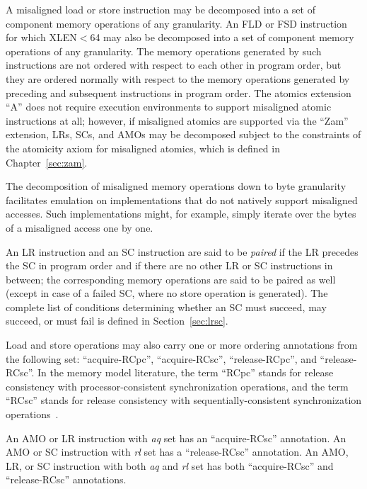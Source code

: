 A misaligned load or store instruction may be decomposed into a set of component memory operations of any granularity.
An FLD or FSD instruction for which XLEN$<$64 may also be decomposed into a set of component memory operations of any granularity.
The memory operations generated by such instructions are not ordered with respect to each other in program order, but they are ordered normally with respect to the memory operations generated by preceding and subsequent instructions in program order.
The atomics extension ``A'' does not require execution environments to support misaligned atomic instructions at all; however, if misaligned atomics are supported via the ``Zam'' extension, LRs, SCs, and AMOs may be decomposed subject to the constraints of the atomicity axiom for misaligned atomics, which is defined in Chapter~\ref{sec:zam}.

\begin{commentary}
  The decomposition of misaligned memory operations down to byte granularity facilitates emulation on implementations that do not natively support misaligned accesses.
  Such implementations might, for example, simply iterate over the bytes of a misaligned access one by one.
\end{commentary}

An LR instruction and an SC instruction are said to be {\em paired} if the LR precedes the SC in program order and if there are no other LR or SC instructions in between; the corresponding memory operations are said to be paired as well (except in case of a failed SC, where no store operation is generated).
The complete list of conditions determining whether an SC must succeed, may succeed, or must fail is defined in Section~\ref{sec:lrsc}.

Load and store operations may also carry one or more ordering annotations from the following set: ``acquire-RCpc'', ``acquire-RCsc'', ``release-RCpc'', and ``release-RCsc''.
In the memory model literature, the term ``RCpc'' stands for release consistency with processor-consistent synchronization operations, and the term ``RCsc'' stands for release consistency with sequentially-consistent synchronization operations~\cite{Gharachorloo90memoryconsistency}.

An AMO or LR instruction with {\em aq} set has an ``acquire-RCsc'' annotation.
An AMO or SC instruction with {\em rl} set has a ``release-RCsc'' annotation.
An AMO, LR, or SC instruction with both {\em aq} and {\em rl} set has both ``acquire-RCsc'' and ``release-RCsc'' annotations.

